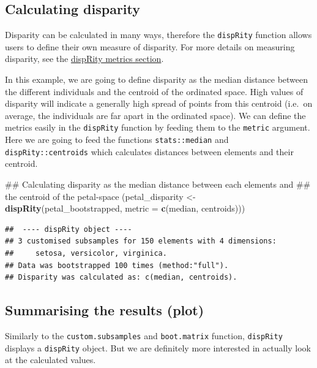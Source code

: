 \documentclass[]{book}
\newenvironment{Shaded}{\begin{snugshade}}{\end{snugshade}}
\newcommand{\KeywordTok}[1]{\textcolor[rgb]{0.13,0.29,0.53}{\textbf{#1}}}
\newcommand{\DataTypeTok}[1]{\textcolor[rgb]{0.13,0.29,0.53}{#1}}
\newcommand{\StringTok}[1]{\textcolor[rgb]{0.31,0.60,0.02}{#1}}
\newcommand{\NormalTok}[1]{#1}
\theoremstyle{definition}
\theoremstyle{definition}
\theoremstyle{remark}
\begin{document}
\subsection{Calculating disparity}\label{calculating-disparity-1}

Disparity can be calculated in many ways, therefore the
\texttt{dispRity} function allows users to define their own measure of
disparity. For more details on measuring disparity, see the
\protect\hyperlink{disparity-metrics}{dispRity metrics section}.

In this example, we are going to define disparity as the median distance
between the different individuals and the centroid of the ordinated
space. High values of disparity will indicate a generally high spread of
points from this centroid (i.e.~on average, the individuals are far
apart in the ordinated space). We can define the metrics easily in the
\texttt{dispRity} function by feeding them to the \texttt{metric}
argument. Here we are going to feed the functions \texttt{stats::median}
and \texttt{dispRity::centroids} which calculates distances between
elements and their centroid.

\begin{Shaded}
\begin{Highlighting}[]
\NormalTok{## Calculating disparity as the median distance between each elements and}
\NormalTok{## the centroid of the petal-space}
\NormalTok{(petal_disparity <-}\StringTok{ }\KeywordTok{dispRity}\NormalTok{(petal_bootstrapped, }\DataTypeTok{metric =} \KeywordTok{c}\NormalTok{(median, centroids)))}
\end{Highlighting}
\end{Shaded}

\begin{verbatim}
##  ---- dispRity object ---- 
## 3 customised subsamples for 150 elements with 4 dimensions:
##     setosa, versicolor, virginica.
## Data was bootstrapped 100 times (method:"full").
## Disparity was calculated as: c(median, centroids).
\end{verbatim}

\subsection{Summarising the results
(plot)}\label{summarising-the-results-plot}

Similarly to the \texttt{custom.subsamples} and \texttt{boot.matrix}
function, \texttt{dispRity} displays a \texttt{dispRity} object. But we
are definitely more interested in actually look at the calculated
values.
\end{document}
